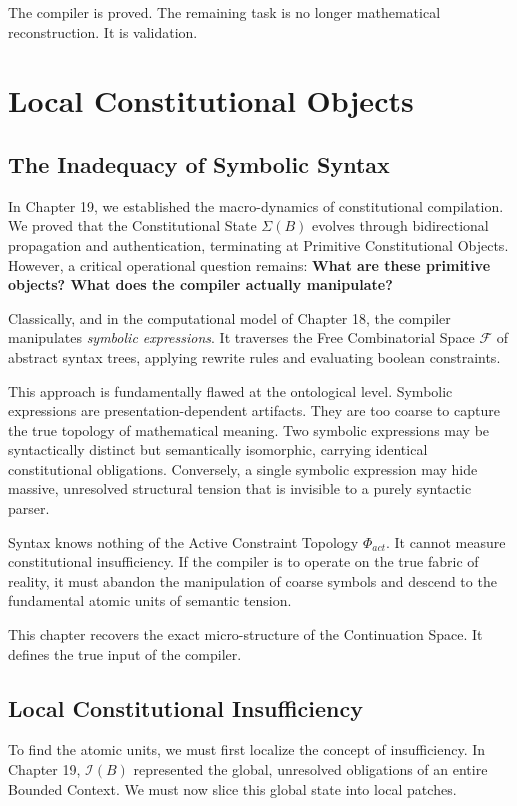 \documentclass[12pt,openany]{extbook}
\theoremstyle{plain}
\theoremstyle{definition}
\begin{document}
The compiler is proved. The remaining task is no longer mathematical reconstruction. It is validation.

\chapter{Local Constitutional Objects}

\section{The Inadequacy of Symbolic Syntax}

In Chapter 19, we established the macro-dynamics of constitutional compilation. We proved that the Constitutional State $\Sigma(B)$ evolves through bidirectional propagation and authentication, terminating at Primitive Constitutional Objects. However, a critical operational question remains: \textbf{What are these primitive objects? What does the compiler actually manipulate?}

Classically, and in the computational model of Chapter 18, the compiler manipulates \emph{symbolic expressions}. It traverses the Free Combinatorial Space $\mathcal{F}$ of abstract syntax trees, applying rewrite rules and evaluating boolean constraints. 

This approach is fundamentally flawed at the ontological level. Symbolic expressions are presentation-dependent artifacts. They are too coarse to capture the true topology of mathematical meaning. Two symbolic expressions may be syntactically distinct but semantically isomorphic, carrying identical constitutional obligations. Conversely, a single symbolic expression may hide massive, unresolved structural tension that is invisible to a purely syntactic parser. 

Syntax knows nothing of the Active Constraint Topology $\Phi_{act}$. It cannot measure constitutional insufficiency. If the compiler is to operate on the true fabric of reality, it must abandon the manipulation of coarse symbols and descend to the fundamental atomic units of semantic tension.

This chapter recovers the exact micro-structure of the Continuation Space. It defines the true input of the compiler.

\section{Local Constitutional Insufficiency}

To find the atomic units, we must first localize the concept of insufficiency. In Chapter 19, $\mathcal{I}(B)$ represented the global, unresolved obligations of an entire Bounded Context. We must now slice this global state into local patches.
\end{document}
